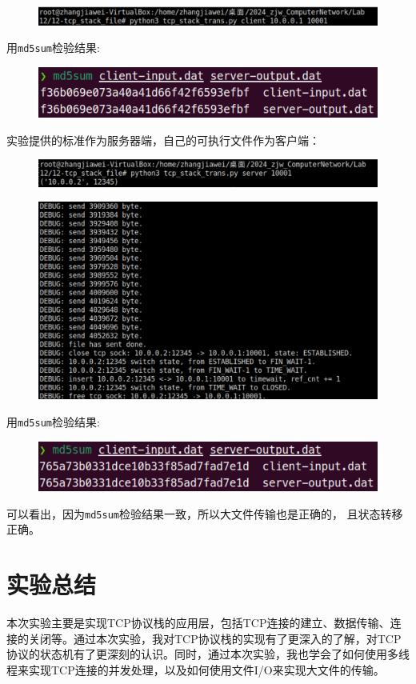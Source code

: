 \documentclass[UTF8]{report}
\begin{document}
\begin{figure}[H]
    \centering
    \includegraphics[width=.75\textwidth]{my_server_std_client_file_h2.png}
\end{figure}

用\texttt{md5sum}检验结果:

\begin{figure}[H]
    \centering
    \includegraphics[width=.75\textwidth]{my_server_std_client_file_md5sum.png}
\end{figure}

实验提供的标准作为服务器端，自己的可执行文件作为客户端：

\begin{figure}[H]
    \centering
    \includegraphics[width=.75\textwidth]{std_server_my_client_file_h1.png}
\end{figure}

\begin{figure}[H]
    \centering
    \includegraphics[width=.75\textwidth]{std_server_my_client_file_h2.png}
\end{figure}

用\texttt{md5sum}检验结果:

\begin{figure}[H]
    \centering
    \includegraphics[width=.75\textwidth]{std_server_my_client_file_md5sum.png}
\end{figure}

可以看出，因为\texttt{md5sum}检验结果一致，所以大文件传输也是正确的， 且状态转移正确。

\section{实验总结}

本次实验主要是实现TCP协议栈的应用层，包括TCP连接的建立、数据传输、连接的关闭等。通过本次实验，我对TCP协议栈的实现有了更深入的了解，对TCP协议的状态机有了更深刻的认识。同时，通过本次实验，我也学会了如何使用多线程来实现TCP连接的并发处理，以及如何使用文件I/O来实现大文件的传输。
\end{document}
